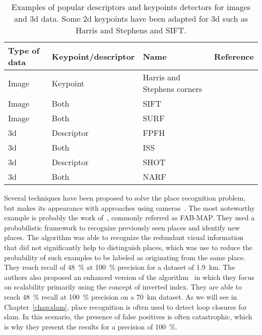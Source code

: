 \begin{table}[htb]
    \centering
    \begin{tabular}{@{}llll@{}}
        \toprule
        \textbf{Type of data}  & \textbf{Keypoint/descriptor} & \textbf{Name}               & \textbf{Reference} \\
        \hline
        Image                  & Keypoint                     & Harris and Stephens corners & \citep{Harris1988}  \\
        Image                  & Both                         & SIFT                        & \citep{Lowe2004}    \\
        Image                  & Both                         & SURF                        & \citep{Bay2006}     \\
        \gls*{3d}              & Descriptor                   & FPFH                        & \citep{Rusu2009}    \\
        \gls*{3d}              & Both                         & ISS                         & \citep{Yu2009}      \\
        \gls*{3d}              & Descriptor                   & SHOT                        & \citep{Tombari2010} \\
        \gls*{3d}              & Both                         & NARF                        & \citep{Steder2011a} \\
        \bottomrule
    \end{tabular}
    \caption[Examples of popular descriptors and keypoints detectors for images and \gls*{3d} data.]{Examples of popular descriptors and keypoints detectors for images and \gls*{3d} data. Some \gls*{2d} keypoints have been adapted for \gls*{3d} such as Harris and Stephens and SIFT.}
    \label{tab:features_examples}
\end{table}

Several techniques have been proposed to solve the place recognition problem, but makes its appearance with approaches using cameras~\citep{Torralba2003, Ulrich2000}. The most noteworthy example is probably the work of~\citet{Cummins2008}, commonly referred as FAB-MAP. They used a probabilistic framework to recognize previously seen places and identify new places. The algorithm was able to recognize the redundant visual information that did not significantly help to distinguish places, which was use to reduce the probability of such examples to be labeled as originating from the same place. They reach recall of \SI{48}{\percent} at \SI{100}{\percent} precision for a dataset of \SI{1.9}{\kilo\meter}. The authors also proposed an enhanced version of the algorithm~\citep{Cummins2011} in which they focus on scalability primarily using the concept of inverted index. They are able to reach \SI{48}{\percent} recall at \SI{100}{\percent} precision on a \SI{70}{\kilo\meter} dataset. As we will see in Chapter~\ref{chap:slam}, place recognition is often used to detect loop closures for \gls*{slam}. In this scenario, the presence of false positives is often catastrophic, which is why they present the results for a precision of \SI{100}{\percent}.

